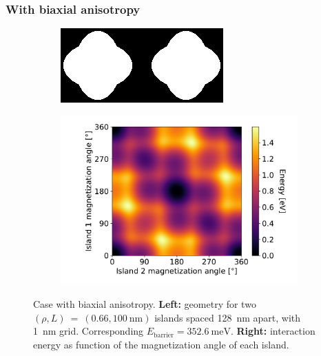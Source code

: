 \documentclass[11pt,a4paper,english,twoside]{article}
\begin{document}
\subsubsection{With biaxial anisotropy}
\begin{figure}[b!]
    \centering
    \begin{subfigure}[c]{4cm} %
         \centering
         \includegraphics[width=\textwidth]{Figures/two_islands/Geometry/geom_r0.66_s100_d128_a0,0_cell1nm.png}
     \end{subfigure}
    \begin{subfigure}[c]{0.7\columnwidth}
         \centering
         \includegraphics[width=\textwidth]{Figures/two_islands/EnergyLandscape/Int_a0Pi,0Pi_d128_r0.66,0.66_cell1nm.pdf}
     \end{subfigure}
    \caption{Case with biaxial anisotropy. \textbf{Left:} geometry for two $(\rho, L)~=~(0.66, \SI{100}{\nano\metre})$ islands spaced \SI{128}{\nano\metre} apart, with \SI{1}{\nano\metre} grid. Corresponding $E_\mathrm{barrier}=\SI{352.6}{\milli\electronvolt}$. \textbf{Right:} interaction energy as function of the magnetization angle of each island.}
    \label{fig:two-islands_interaction_(r0.66_L100)_a0and0}
\end{figure}
\end{document}
